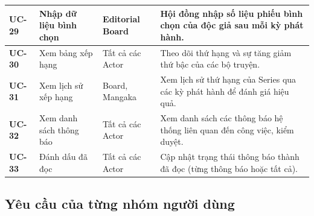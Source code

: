 \begin{longtable}{|p{1.3cm}|p{4.2cm}|p{3.2cm}|p{6.0cm}|}
    \textbf{UC-29} & Nhập dữ liệu bình chọn & Editorial Board & Hội đồng nhập số liệu phiếu bình chọn của độc giả sau mỗi kỳ phát hành. \\ \hline
    \textbf{UC-30} & Xem bảng xếp hạng & Tất cả các Actor & Theo dõi thứ hạng và sự tăng giảm thứ bậc của các bộ truyện. \\ \hline
    \textbf{UC-31} & Xem lịch sử xếp hạng & Board, Mangaka & Xem lịch sử thứ hạng của Series qua các kỳ phát hành để đánh giá hiệu quả. \\ \hline
    \textbf{UC-32} & Xem danh sách thông báo & Tất cả các Actor & Xem danh sách các thông báo hệ thống liên quan đến công việc, kiểm duyệt. \\ \hline
    \textbf{UC-33} & Đánh dấu đã đọc & Tất cả các Actor & Cập nhật trạng thái thông báo thành đã đọc (từng thông báo hoặc tất cả). \\ \hline
\end{longtable}

\subsection{Yêu cầu của từng nhóm người dùng}
\label{subsec:srs_user_specific_requirements}
